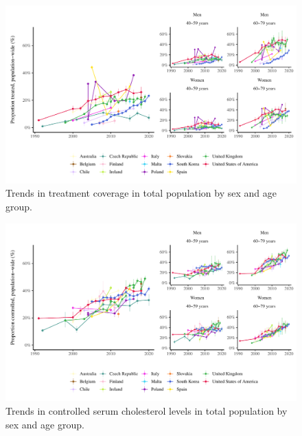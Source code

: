 \documentclass[12pt]{article}
\begin{document}
\begin{appendix}
\begin{refsection}
\begin{landscape}
        \begin{figure}[H]
            \centering
            \includegraphics[width=\linewidth]{../3_figures/treated_pop.pdf}
            \caption{Trends in treatment coverage in total population by sex and age group.}
            \label{fig:treated_pop}
        \end{figure}

        \begin{figure}[H]
            \centering
            \includegraphics[width=\linewidth]{../3_figures/controlled_pop.pdf}
            \caption{Trends in controlled serum cholesterol levels in total population by sex and age group.}
            \label{fig:controlled_pop}
        \end{figure}


\end{landscape}
\end{refsection}
\end{appendix}
\end{document}
